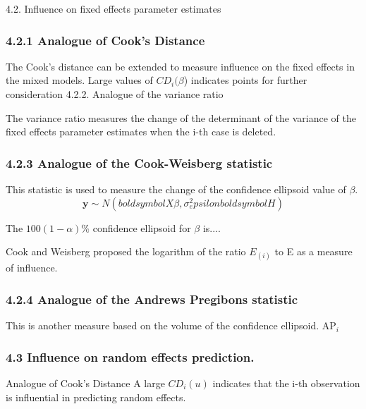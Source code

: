 \documentclass[12pt, a4paper]{article}
\begin{document}
4.2. Influence on fixed effects parameter estimates
\subsubsection*{4.2.1 Analogue of Cook’s Distance}
The Cook’s distance can be extended to measure influence on the fixed effects in the mixed models.
Large values of $CD_i(\beta$) indicates points for further consideration
4.2.2. Analogue of the variance ratio

The variance ratio measures the change of the determinant of the variance of the fixed effects parameter estimates when the i-th case is deleted.

\subsubsection*{4.2.3 Analogue of the Cook-Weisberg statistic}

This statistic is used to measure the change of the confidence ellipsoid value of $\beta$.
\[ \boldsymbol{y} \sim N ( boldsymbol{X}\beta , \sigma^2_epsilon boldsymbol{H})\]

The $100(1-\alpha)\%$ confidence ellipsoid for $\beta$ is....

Cook and Weisberg proposed the logarithm of the ratio $E_{(i)}$ to E as a measure of influence.




\subsubsection*{4.2.4 Analogue of the Andrews Pregibons statistic}
This is another measure based on the volume of the confidence ellipsoid. AP$_i$

\subsubsection*{4.3 Influence on random effects prediction.}
Analogue of Cook’s Distance
A large $CD_i(u)$ indicates that the i-th observation is influential in predicting random effects.
\end{document}

